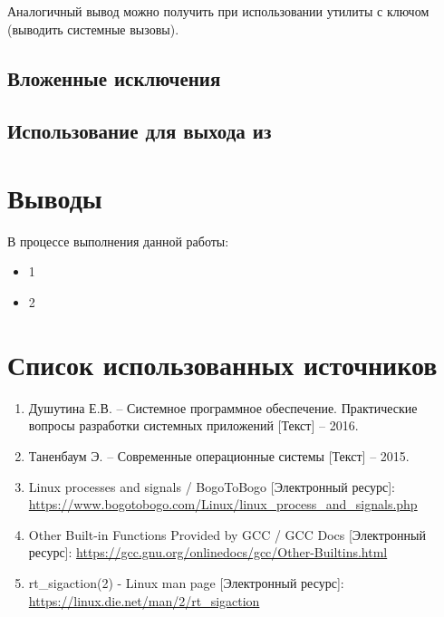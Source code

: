 Аналогичный вывод можно получить при использовании утилиты  с ключом  (выводить системные вызовы).



\subsection{Вложенные исключения}

\subsection{Использование  для выхода из }

\section{Выводы}

В процессе выполнения данной работы:

\begin{itemize}
	\item 1
	\item 2
\end{itemize}

\newpage

\section*{Список использованных источников}

\begin{enumerate}
	\item Душутина Е.В. -- Системное программное обеспечение. Практические вопросы разработки системных приложений [Текст] -- 2016.
	\item Таненбаум Э. -- Современные операционные системы [Текст] -- 2015.
	\item Linux processes and signals / BogoToBogo [Электронный ресурс]:\\
		{\small\url{https://www.bogotobogo.com/Linux/linux_process_and_signals.php}}
	\item Other Built-in Functions Provided by GCC / GCC Docs [Электронный ресурс]:
		{\small\url{https://gcc.gnu.org/onlinedocs/gcc/Other-Builtins.html}}
	\item rt\_sigaction(2) - Linux man page [Электронный ресурс]:\\
		{\small\url{https://linux.die.net/man/2/rt_sigaction}}
\end{enumerate}


